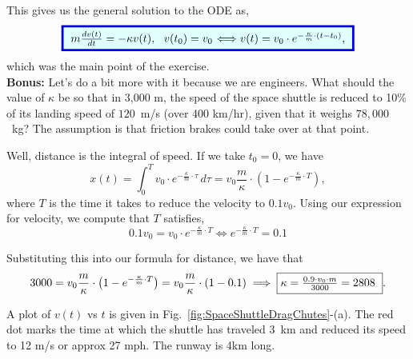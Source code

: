 This gives us the general solution to the ODE as,
\begin{equation}
    \label{eq:ODEHorizontalLinearDrag}
    \setlength{\fboxrule}{2pt} %
    \fcolorbox{brightblue}{lightblue}{%
    \addtolength{\fboxsep}{5pt} %
    \( m \frac{dv(t)}{dt} =  - \kappa v(t),~~  v(t_0)=v_0  \) \(\Longleftrightarrow v(t) = v_0 \cdot e^{ -\frac{\kappa}{m} \cdot \left( t - t_0 \right)} \),
    }
\end{equation}
which was the main point of the exercise. \\

\textbf{Bonus:} Let's do a bit more with it because we are engineers. What should the value of $\kappa$ be so that in 3,000 m, the speed of the space shuttle is reduced to 10\% of its landing speed of $120$~m/s  (over 400 km/hr), given that it weighs $78,000$~kg? The assumption is that friction brakes could take over at that point. 

Well, distance is the integral of speed. If we take $t_0= 0$, we have
$$x(t) = \int_0^T  v_0 \cdot e^{ -\frac{\kappa}{m} \cdot \tau} \, d \tau = v_0 \frac{m}{\kappa} \cdot \left(1 - e^{ -\frac{\kappa}{m} \cdot T} \right),$$
where $T$ is the time it takes to reduce the velocity to $0.1 v_0$. Using our expression for velocity, we compute that $T$ satisfies, 
$$0.1 v_0 = v_0 \cdot e^{ -\frac{\kappa}{m} \cdot T} \iff e^{ -\frac{\kappa}{m} \cdot T}  = 0.1$$

Substituting this into our formula for distance, we have that 
$$ 3000 =  v_0 \frac{m}{\kappa} \cdot \left(1 - e^{ -\frac{\kappa}{m} \cdot T} \right) = v_0 \frac{m}{\kappa}\cdot \left(1 - 0.1 \right)\implies \fbox{$ \kappa = \frac{0.9\cdot v_0 \cdot m}{3000} = 2808$ }.$$




A plot of $v(t)$ vs $t$ is given in Fig.~\ref{fig:SpaceShuttleDragChutes}-(a). The red dot marks the time at which the shuttle has traveled 3~km and reduced its speed to 12 m/s or approx 27 mph. The runway is 4km long. 


\Qed



\bigskip


